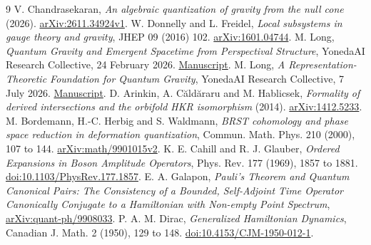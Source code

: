 \documentclass[11pt,letterpaper]{article}
\begin{document}
\begin{thebibliography}{9}
\small
{} V. Chandrasekaran, \emph{An algebraic quantization of gravity from the null cone} (2026). \href{https://arxiv.org/abs/2611.34924v1}{arXiv:2611.34924v1}.
 W. Donnelly and L. Freidel, \emph{Local subsystems in gauge theory and gravity}, JHEP 09 (2016) 102. \href{https://arxiv.org/abs/1601.04744}{arXiv:1601.04744}.
 M. Long, \emph{Quantum Gravity and Emergent Spacetime from Perspectival Structure}, YonedaAI Research Collective, 24 February 2026. \href{https://yonedaai.com/papers/pdf/quantum-gravity-emergent-spacetime.pdf}{Manuscript}.
 M. Long, \emph{A Representation-Theoretic Foundation for Quantum Gravity}, YonedaAI Research Collective, 7 July 2026. \href{https://yonedaai.com/papers/pdf/library/condensed-representation/part6-condensed-quantum-gravity.pdf}{Manuscript}.
 D. Arinkin, A. C\u{a}ld\u{a}raru and M. Hablicsek, \emph{Formality of derived intersections and the orbifold HKR isomorphism} (2014). \href{https://arxiv.org/abs/1412.5233}{arXiv:1412.5233}.
 M. Bordemann, H.-C. Herbig and S. Waldmann, \emph{BRST cohomology and phase space reduction in deformation quantization}, Commun. Math. Phys. 210 (2000), 107 to 144. \href{https://arxiv.org/abs/math/9901015v2}{arXiv:math/9901015v2}.
 K. E. Cahill and R. J. Glauber, \emph{Ordered Expansions in Boson Amplitude Operators}, Phys. Rev. 177 (1969), 1857 to 1881. \href{https://doi.org/10.1103/PhysRev.177.1857}{doi:10.1103/PhysRev.177.1857}.
 E. A. Galapon, \emph{Pauli's Theorem and Quantum Canonical Pairs: The Consistency of a Bounded, Self-Adjoint Time Operator Canonically Conjugate to a Hamiltonian with Non-empty Point Spectrum}, \href{https://arxiv.org/abs/quant-ph/9908033}{arXiv:quant-ph/9908033}.
 P. A. M. Dirac, \emph{Generalized Hamiltonian Dynamics}, Canadian J. Math. 2 (1950), 129 to 148. \href{https://doi.org/10.4153/CJM-1950-012-1}{doi:10.4153/CJM-1950-012-1}.
\end{thebibliography}
\end{document}
